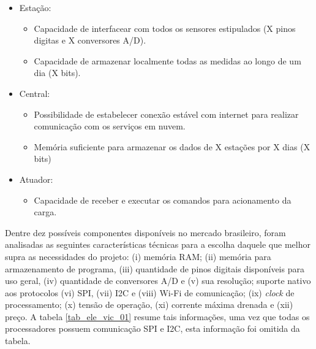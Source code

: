 	\begin{itemize}
		\item Estação:
			\begin{itemize}
				\item Capacidade de interfacear com todos os sensores estipulados (X pinos digitas e X conversores A/D).
				\item Capacidade de armazenar localmente todas as medidas ao longo de um dia (X bits).
			\end{itemize}
		\item Central:
			\begin{itemize}
				\item Possibilidade de estabelecer conexão estável com internet para realizar comunicação com os serviços em nuvem. 
				\item Memória suficiente para armazenar os dados de X estações por X dias (X bits)
			\end{itemize}
		\item Atuador:
			\begin{itemize}
				\item Capacidade de receber e executar os comandos para acionamento da carga.
			\end{itemize}
	\end{itemize}

	Dentre dez possíveis componentes disponíveis no mercado brasileiro, foram analisadas as seguintes características técnicas para a escolha daquele que melhor supra as necessidades do projeto: (i) memória RAM; (ii) memória para armazenamento de programa, (iii) quantidade de pinos digitais disponíveis para uso geral, (iv) quantidade de conversores A/D e (v) sua resolução; suporte nativo aos protocolos (vi) SPI, (vii) I2C e (viii) Wi-Fi de comunicação; (ix) \emph{clock} de processamento; (x) tensão de operação, (xi) corrente máxima drenada e (xii) preço. A tabela \ref{tab_ele_vic_01} resume tais informações, uma vez que todas os processadores possuem comunicação SPI e I2C, esta informação foi omitida da tabela.  


